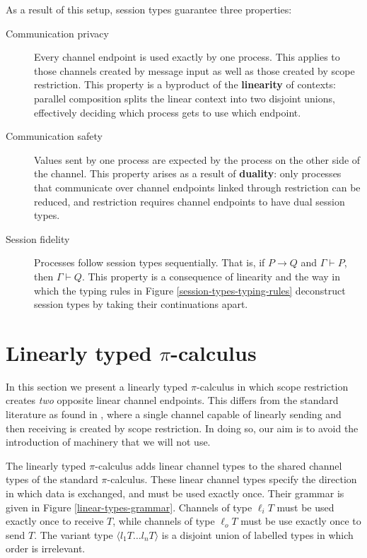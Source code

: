 \documentclass{mproj}
\newcommand{\picalc}{$\pi$-calculus}
\newcommand{\reduce}{\rightarrow}
\newcommand{\types}{\vdash}
\begin{document}
As a result of this setup, session types guarantee three properties:
\begin{description}
    \item [Communication privacy] Every channel endpoint is used exactly by one process. This applies to those channels created by message input as well as those created by scope restriction. This property is a byproduct of the \textbf{linearity} of contexts: parallel composition splits the linear context into two disjoint unions, effectively deciding which process gets to use which endpoint.
        
    \item [Communication safety] Values sent by one process are expected by the process on the other side of the channel. This property arises as a result of \textbf{duality}: only processes that communicate over channel endpoints linked through restriction can be reduced, and restriction requires channel endpoints to have dual session types.

    \item [Session fidelity] Processes follow session types sequentially. That is, if $P \reduce Q$ and $\Gamma \types P$, then $\Gamma \types Q$. This property is a consequence of linearity and the way in which the typing rules in Figure \ref{session-types-typing-rules} deconstruct session types by taking their continuations apart.
\end{description}

\section{Linearly typed \picalc{}}\label{linear-picalc}

In this section we present a linearly typed \picalc{} in which scope restriction creates \emph{two} opposite linear channel endpoints. This differs from the standard literature as found in \cite{Dardha2017}, where a single channel capable of linearly sending and then receiving is created by scope restriction. In doing so, our aim is to avoid the introduction of machinery that we will not use.

The linearly typed \picalc{} adds linear channel types to the shared channel types of the standard \picalc{}. These linear channel types specify the direction in which data is exchanged, and must be used exactly once. Their grammar is given in Figure \ref{linear-types-grammar}. Channels of type $\ell_i T$ must be used exactly once to receive $T$, while channels of type $\ell_o T$ must be use exactly once to send $T$. The variant type $\langle l_1 T \ldots l_n T \rangle$ is a disjoint union of labelled types in which order is irrelevant.
\end{document}
